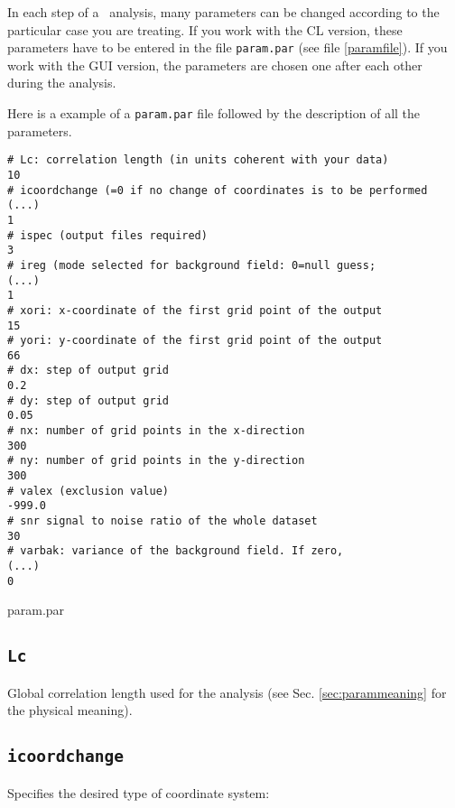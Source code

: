In each step of a \diva\, analysis, many parameters can be changed according to the particular case you are treating. If you work with the CL version, these parameters have to be entered in the file \texttt{param.par} (see file \ref{paramfile}). If you work with the GUI version, the parameters are chosen one after each other during the analysis.

Here is a example of a \texttt{param.par} file followed by the description of all the parameters.

\begin{exfile}[htpb]
\begin{footnotesize}
\begin{verbatim}
# Lc: correlation length (in units coherent with your data)
10
# icoordchange (=0 if no change of coordinates is to be performed (...)
1
# ispec (output files required)
3
# ireg (mode selected for background field: 0=null guess;         (...)
1
# xori: x-coordinate of the first grid point of the output
15
# yori: y-coordinate of the first grid point of the output
66
# dx: step of output grid
0.2
# dy: step of output grid
0.05
# nx: number of grid points in the x-direction
300
# ny: number of grid points in the y-direction
300
# valex (exclusion value)
-999.0
# snr signal to noise ratio of the whole dataset
30
# varbak: variance of the background field. If zero,              (...)
0
\end{verbatim}
\end{footnotesize}
\caption{param.par\label{paramfile}}
\end{exfile}



\subsection{\texttt{Lc}}

Global correlation length used for the analysis (see Sec. \ref{sec:parammeaning} for the physical meaning).

\subsection{\texttt{icoordchange}\label{sec:icoord}}


Specifies the desired type of coordinate system:\\

